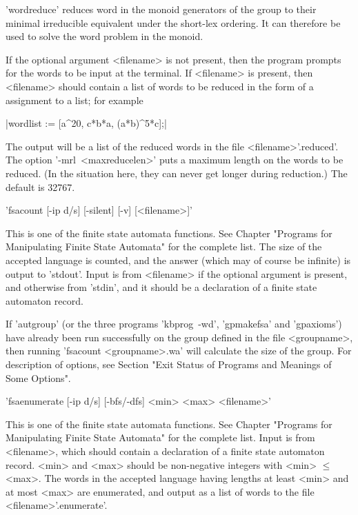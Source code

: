 'wordreduce' reduces word in the monoid generators of the group to their
minimal irreducible equivalent under the short-lex ordering.
It can therefore be used to solve the word problem in the
monoid.

If the optional argument <filename> is not present, then the program prompts
for the words to be input at the terminal. If <filename> is present, then
<filename> should contain a list of words to be reduced in the form of a
{\GAP} assignment to a list; for example\:

|wordlist := [a^20, c*b*a, (a*b)^5*c];|

The output will be a list of the reduced words in the file <filename>'.reduced'.
The option '-mrl\ <maxreducelen>' puts a maximum length on the words to
be reduced. (In the situation here, they can never get longer during reduction.)
The default is 32767.

'fsacount  [-ip d/s] [-silent] [-v] [<filename>]'

This is one of the finite state automata functions. See Chapter
"Programs for Manipulating Finite State Automata" for the complete list.
The size of the accepted language is counted, and the answer (which may
of course be infinite) is output to 'stdout'. Input is from <filename> if
the optional argument is present, and otherwise from 'stdin', and it
should be a declaration of a finite state automaton record.

If 'autgroup' (or the three programs 'kbprog\ -wd', 'gpmakefsa'
and 'gpaxioms') have already been run successfully on the group defined
in the file <groupname>, then running 'fsacount <groupname>.wa'
will calculate the size of the group.
For description of options, see Section
"Exit Status of Programs and Meanings of Some Options".


'fsaenumerate  [-ip d/s] [-bfs/-dfs] <min> <max> <filename>'

This is one of the finite state automata functions. See Chapter
"Programs for Manipulating Finite State Automata" for the complete list.
Input is from <filename>, which should contain a declaration of a finite
state automaton record.
<min> and <max> should be non-negative integers with <min> $\le$ <max>.
The words in the accepted language having lengths at least <min> and at
most <max> are enumerated, and output as a list of words to the file
<filename>'.enumerate'.

